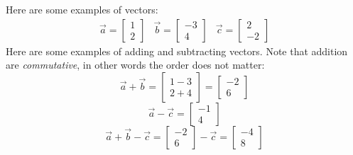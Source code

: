\begin{example}
  Here are some examples of vectors:
  \begin{eqnarray*}
    \vec{a} = \begin{bmatrix}
      1 \\
      2
    \end{bmatrix} & 
    \vec{b} = \begin{bmatrix}
      -3 \\
      4
    \end{bmatrix} &
    \vec{c} = \begin{bmatrix}
      2 \\
      -2
    \end{bmatrix}
  \end{eqnarray*}
  Here are some examples of adding and subtracting vectors. Note that addition are \textit{commutative}, in other words the order does not matter:
  \begin{equation*}
    \vec{a} + \vec{b} = \begin{bmatrix}
      1 - 3 \\
      2 + 4
    \end{bmatrix} = \begin{bmatrix}
      -2 \\
      6
    \end{bmatrix}
  \end{equation*}
  \begin{equation*}
    \vec{a} - \vec{c} = \begin{bmatrix}
      -1 \\
      4
    \end{bmatrix} 
  \end{equation*}
  \begin{equation*}
    \vec{a} + \vec{b} - \vec{c} = \begin{bmatrix}
      -2 \\
      6
    \end{bmatrix} - \vec{c} = \begin{bmatrix}
      -4 \\
      8
    \end{bmatrix}
  \end{equation*}
\end{example}


